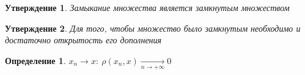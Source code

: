 \documentclass[a4paper]{article}
\newtheorem*{statement}{Утверждение}
\theoremstyle{definition}
\newtheorem*{definition}{Определение}
\theoremstyle{remark}
\begin{document}
\begin{tcolorbox}
\begin{statement}
    Замыкание множества является замкнутым множеством
\end{statement}
\end{tcolorbox}

\begin{tcolorbox}
\begin{statement}
    Для того, чтобы множество было замкнутым необходимо и достаточно
    открытость его дополнения
\end{statement}
\end{tcolorbox}

\begin{tcolorbox}
\begin{definition}
$ x_n \to x: \ \rho(x_n, x) \xrightarrow[n \to +\infty]{} 0 $ 
\end{definition}
\end{tcolorbox}
\end{document}
